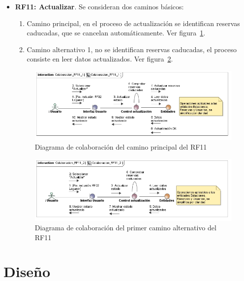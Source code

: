 \begin{itemize}
	\FloatBarrier
	\item \textbf{RF11: Actualizar}. Se consideran dos caminos básicos: 
	\begin{enumerate}
		\item Camino principal, en el proceso de actualización se identifican reservas caducadas, que se cancelan automáticamente. Ver figura~\ref{fig:diagramaColaboracion_RF11_1}.
		\item Camino alternativo 1, no se identifican reservas caducadas, el proceso consiste en leer datos actualizados. Ver figura~\ref{fig:diagramaColaboracion_RF11_2}.
	\end{enumerate}
	\begin{figure} [!htb]
		\centering
		\includegraphics[width=\linewidth,height=\textheight,keepaspectratio]{Images/Diagramas/04_Colaboracion_RF11_1}
		\caption{Diagrama de colaboración del camino principal del RF11}
		\label{fig:diagramaColaboracion_RF11_1}
	\end{figure}
	\begin{figure} [!htb]
		\centering
		\includegraphics[width=\linewidth,height=\textheight,keepaspectratio]{Images/Diagramas/04_Colaboracion_RF11_2}
		\caption{Diagrama de colaboración del primer camino alternativo del RF11}
		\label{fig:diagramaColaboracion_RF11_2}
	\end{figure}
		
\end{itemize}



\FloatBarrier
\section{Diseño}

